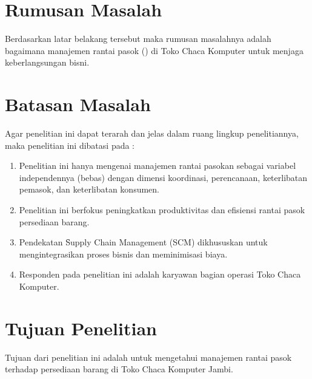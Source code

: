 \section{Rumusan Masalah}
Berdasarkan latar belakang tersebut maka rumusan masalahnya adalah bagaimana
manajemen rantai pasok (\SCM) di Toko Chaca Komputer untuk menjaga keberlangsungan bisni.

\section{Batasan Masalah}
Agar penelitian ini dapat terarah dan jelas dalam ruang lingkup penelitiannya, maka penelitian ini dibatasi pada :
\begin{enumerate}
	\item Penelitian ini hanya mengenai manajemen rantai pasokan sebagai variabel independennya (bebas) dengan dimensi koordinasi, perencanaan, keterlibatan pemasok, dan keterlibatan konsumen.
	
	\item Penelitian ini berfokus peningkatkan produktivitas dan efisiensi rantai pasok persediaan barang.
	
	\item Pendekatan \f{Supply Chain Management} (SCM) dikhususkan untuk mengintegrasikan proses bisnis dan meminimisasi biaya.
	
	\item Responden pada penelitian ini adalah karyawan bagian operasi Toko Chaca Komputer. 
\end{enumerate}


\section{Tujuan Penelitian}
Tujuan dari penelitian ini adalah untuk mengetahui manajemen rantai pasok terhadap persediaan barang di Toko Chaca Komputer Jambi.

